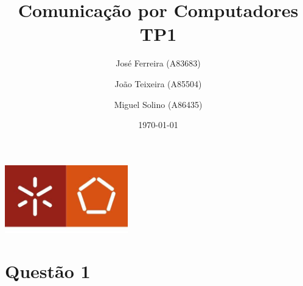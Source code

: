 \documentclass[a4paper]{report}
\begin{document}
\title{Comunicação por Computadores\\ 
\large TP1}
\author{José Ferreira (A83683) \and João Teixeira (A85504) \and Miguel Solino (A86435)}
\date{\today}

\begin{center}
    \begin{minipage}{0.75\linewidth}
        \centering
        \includegraphics[width=0.4\textwidth]{images/eng.jpeg}\par\vspace{1cm}
        \vspace{1.5cm}
        \href{https://www.uminho.pt/PT}
        {\color{black}{\scshape\LARGE Universidade do Minho}} \par
        \vspace{1cm}
        \href{https://www.di.uminho.pt/}
        {\color{black}{\scshape\Large Departamento de Informática}} \par
        \vspace{1.5cm}
        \maketitle
    \end{minipage}
\end{center}

\chapter{Questão 1}
\end{document}
